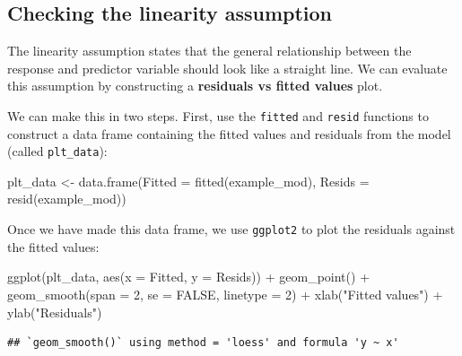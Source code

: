 \documentclass[
]{book}
\newenvironment{Shaded}{\begin{snugshade}}{\end{snugshade}}
\newcommand{\AttributeTok}[1]{\textcolor[rgb]{0.77,0.63,0.00}{#1}}
\newcommand{\ConstantTok}[1]{\textcolor[rgb]{0.00,0.00,0.00}{#1}}
\newcommand{\DecValTok}[1]{\textcolor[rgb]{0.00,0.00,0.81}{#1}}
\newcommand{\FunctionTok}[1]{\textcolor[rgb]{0.00,0.00,0.00}{#1}}
\newcommand{\NormalTok}[1]{#1}
\newcommand{\OtherTok}[1]{\textcolor[rgb]{0.56,0.35,0.01}{#1}}
\newcommand{\SpecialCharTok}[1]{\textcolor[rgb]{0.00,0.00,0.00}{#1}}
\newcommand{\StringTok}[1]{\textcolor[rgb]{0.31,0.60,0.02}{#1}}
\begin{document}
\hypertarget{checking-the-linearity-assumption}{%
\subsection{Checking the linearity assumption}\label{checking-the-linearity-assumption}}

The linearity assumption states that the general relationship between the response and predictor variable should look like a straight line. We can evaluate this assumption by constructing a \textbf{residuals vs fitted values} plot.

We can make this in two steps. First, use the \texttt{fitted} and \texttt{resid} functions to construct a data frame containing the fitted values and residuals from the model (called \texttt{plt\_data}):

\begin{Shaded}
\begin{Highlighting}[]
\NormalTok{plt\_data }\OtherTok{\textless{}{-}} 
  \FunctionTok{data.frame}\NormalTok{(}\AttributeTok{Fitted =} \FunctionTok{fitted}\NormalTok{(example\_mod), }
             \AttributeTok{Resids =}  \FunctionTok{resid}\NormalTok{(example\_mod))}
\end{Highlighting}
\end{Shaded}

Once we have made this data frame, we use \texttt{ggplot2} to plot the residuals against the fitted values:

\begin{Shaded}
\begin{Highlighting}[]
\FunctionTok{ggplot}\NormalTok{(plt\_data, }\FunctionTok{aes}\NormalTok{(}\AttributeTok{x =}\NormalTok{ Fitted, }\AttributeTok{y =}\NormalTok{ Resids)) }\SpecialCharTok{+} 
  \FunctionTok{geom\_point}\NormalTok{() }\SpecialCharTok{+} 
  \FunctionTok{geom\_smooth}\NormalTok{(}\AttributeTok{span =} \DecValTok{2}\NormalTok{, }\AttributeTok{se =} \ConstantTok{FALSE}\NormalTok{, }\AttributeTok{linetype =} \DecValTok{2}\NormalTok{) }\SpecialCharTok{+}
  \FunctionTok{xlab}\NormalTok{(}\StringTok{"Fitted values"}\NormalTok{) }\SpecialCharTok{+} \FunctionTok{ylab}\NormalTok{(}\StringTok{"Residuals"}\NormalTok{)}
\end{Highlighting}
\end{Shaded}

\begin{verbatim}
## `geom_smooth()` using method = 'loess' and formula 'y ~ x'
\end{verbatim}
\end{document}
